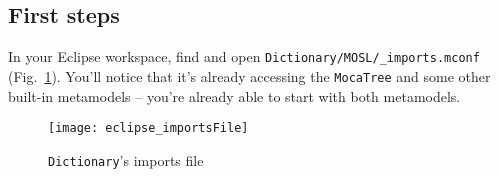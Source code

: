 \newpage
\hypertarget{initialize tex}{}
\subsection{First steps}
\texHeader

In your Eclipse workspace, find and open \texttt{Dictionary/MOSL/\_imports.mconf} (Fig.~\ref{eclipse:standardImports}). You'll notice that it's already
accessing the \texttt{MocaTree} and some other built-in metamodels -- you're already able to start with both metamodels.

\vspace{0.5cm}

\begin{figure}[htbp]
\begin{center}
  \texttt{[image: eclipse\_importsFile]}
  \caption{\texttt{Dictionary}'s imports file}
  \label{eclipse:standardImports}
\end{center}
\end{figure}

